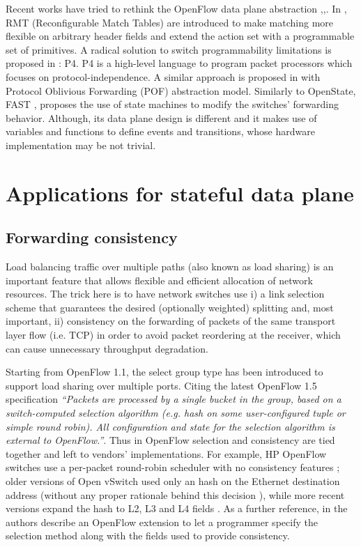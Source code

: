 \documentclass[10pt,conference]{IEEEtran}
\begin{document}
Recent works have tried to rethink the OpenFlow data plane abstraction \cite{Bos13},\cite{Bos14},\cite{Son13}. In \cite{Bos13}, RMT (Reconfigurable Match Tables) are introduced to make matching more flexible on arbitrary header fields and extend the action set with a programmable set of primitives. A radical solution to switch programmability limitations is proposed in \cite{Bos14}: P4. P4 is a high-level language to program packet processors which focuses on protocol-independence. A similar approach is proposed in \cite{Son13} with Protocol Oblivious Forwarding (POF) abstraction model. Similarly to OpenState, FAST \cite{Mos14}, proposes the use of state machines to modify the switches' forwarding behavior. Although, its data plane design is different and it makes use of variables and functions to define events and transitions, whose hardware implementation may be not trivial.

\section{Applications for stateful data plane}
\label{sec:applications}

\subsection{Forwarding consistency}
\label{sec:fwc}

Load balancing traffic over multiple paths (also known as load sharing) is an important feature that allows flexible and efficient allocation of network resources. The trick here is to have network switches use i) a link selection scheme that guarantees the desired (optionally weighted) splitting and, most important, ii) consistency on the forwarding of packets of the same transport layer flow (i.e. TCP) in order to avoid packet reordering at the receiver, which can cause unnecessary throughput degradation.

Starting from OpenFlow 1.1, the select group type has been introduced to support load sharing over multiple ports. Citing the latest OpenFlow 1.5 specification \emph{``Packets are processed by a single bucket in the group, based on a switch-computed selection algorithm (e.g. hash on some user-configured tuple or simple round robin). All configuration and state for the selection algorithm is external to OpenFlow.''}. Thus in OpenFlow selection and consistency are tied together and left to vendors' implementations. For example, HP OpenFlow switches use a per-packet round-robin scheduler with no consistency features \cite{hp-of13-manual}; older versions of Open vSwitch used only an hash on the Ethernet destination address (without any proper rationale behind this decision \cite{pfaff14}), while more recent versions expand the hash to L2, L3 and L4 fields \cite{seetharaman14}. As a further reference, in \cite{horman14} the authors describe an OpenFlow extension to let a programmer specify the selection method along with the fields used to provide consistency.
\end{document}
